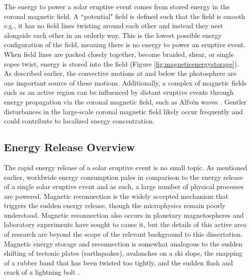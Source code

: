 The energy to power a solar eruptive event comes from stored energy in the coronal magnetic field. A ``potential" field is defined such that the field is smooth e.g., it has no field lines twisting around each other and instead they nest alongside each other in an orderly way. This is the lowest possible energy configuration of the field, meaning there is no energy to power an eruptive event. When field lines are packed closely together, become braided, shear, or single ropes twist, energy is stored into the field (Figure \ref{fig:magneticenergystorage}). As described earlier, the convective motions at and below the photosphere are one important source of these motions. Additionally, a complex of magnetic fields such as an active region can be influenced by distant eruptive events through energy propagation via the coronal magnetic field, such as Alfv\'en waves \citep{Schrijver2011}. Gentler disturbances in the large-scale coronal magnetic field likely occur frequently and could contribute to localized energy concentration. 

\subsection{Energy Release Overview}
The rapid energy release of a solar eruptive event is no small topic. As mentioned earlier, worldwide energy consumption pales in comparison to the energy release of a single solar eruptive event and as such, a large number of physical processes are powered. Magnetic reconnection is the widely accepted mechanism that triggers the sudden energy release, though the microphysics remain poorly understood. Magnetic reconnection also occurs in planetary magnetospheres and laboratory experiments have sought to cause it, but the details of this active area of research are beyond the scope of the relevant background to this dissertation. Magnetic energy storage and reconnection is somewhat analogous to the sudden shifting of tectonic plates (earthquakes), avalanches on a ski slope, the snapping of a rubber band that has been twisted too tightly, and the sudden flash and crack of a lightning bolt \citep{Lang2001}. 


